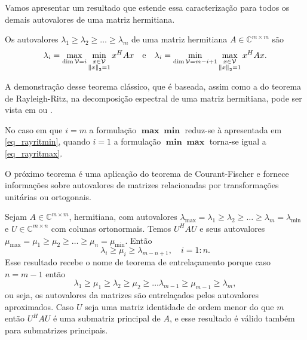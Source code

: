 Vamos apresentar um resultado que estende essa caracterização para todos os demais autovalores de uma matriz hermitiana.
\begin{teore}\label{teo_courantfisher}
Os autovalores $\lambda_1\geqslant\lambda_2\geqslant\ldots\geqslant\lambda_m$  de uma matriz hermitiana $A\in\mathbb{C}^{m\times m}$ são
\[
  \lambda_i=\max_{\dim\mathcal{V}=i}\min_{\begin{subarray}{c}x\in\mathcal{V}\\{\Vert x\Vert}_2=1\end{subarray}} x^HAx\quad\text{e}\quad\lambda_i=\min_{\dim\mathcal{V}=m-i+1}\max_{\begin{subarray}{c}x\in\mathcal{V}\\{\Vert x\Vert}_2=1\end{subarray}} x^HAx.
\]
\end{teore}
A demonstração desse teorema clássico, que é baseada, assim como a do teorema de Rayleigh-Ritz, na decomposição espectral de uma matriz hermitiana, pode ser vista em \cite[pág. 179]{HornJohnson87Matrix} ou \cite[pág. 550]{Meyer00Matrix}.
\begin{obs}\label{obs_courafisch}
No caso em que $i=m$ a formulação $\mathbf{\max\min}$ reduz-se à apresentada em \eqref{eq_rayritmin}, quando $i=1$ a formulação $\mathbf{\min\max}$ torna-se igual a \eqref{eq_rayritmax}.
\end{obs}

O pr\'{o}ximo teorema é uma aplicação do teorema de Courant-Fischer e fornece informações sobre autovalores de matrizes relacionadas por transformaç\~{o}es unitárias ou ortogonais.
\begin{teore}\label{teo_interlacing}
Sejam $A\in\mathbb{C}^{m\times m}$, hermitiana, com autovalores $\lambda_{\max}=\lambda_1\geqslant\lambda_2\geqslant\ldots\geqslant\lambda_m=\lambda_{\min}$ e $U\in\mathbb{C}^{m\times n}$  com colunas ortonormais. Temos $U^HAU$ e seus autovalores $\mu_{\max}=\mu_1\geqslant\mu_2\geqslant\ldots\geqslant\mu_n=\mu_{\min}$. Então
\[
\lambda_i\geqslant \mu_i \geqslant \lambda_{m-n+1}, \quad i=1:n.
\]
Esse resultado recebe o nome de teorema de entrelaçamento porque caso $n=m-1$ então
\[
\lambda_1\geqslant\mu_1\geqslant\lambda_2\geqslant\mu_2\geqslant\ldots\lambda_{m-1}\geqslant\mu_{m-1}\geqslant\lambda_m,
\]
ou seja, os autovalores da matrizes são entrelaçados pelos autovalores aproximados. Caso $U$ seja uma matriz identidade de ordem menor do que $m$ então $U^HAU$ é uma submatriz principal de $A$, e esse resultado é válido também para submatrizes principais.
\end{teore}

